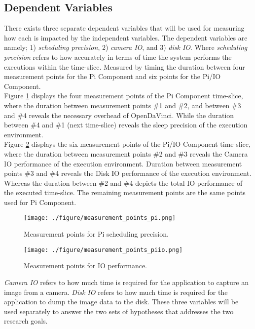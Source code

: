 \subsection{Dependent Variables} \label{section:dependent}
There exists three separate dependent variables that will be used for measuring how each is impacted by the independent variables. The dependent variables are namely; 1) \textit{scheduling precision}, 2) \textit{camera IO}, and 3) \textit{disk IO}. Where \textit{scheduling precision} refers to how accurately in terms of time the system performs the executions within the time-slice. Measured by timing the duration between four measurement points for the Pi Component and six points for the Pi/IO Component.\\ 

Figure \ref{pi_measure} displays the four measurement points of the Pi Component time-slice, where the duration between measurement points \#1 and \#2, and between \#3 and \#4 reveals the necessary overhead of OpenDaVinci. While the duration between \#4 and \#1 (next time-slice) reveals the sleep precision of the execution environment.\\

Figure \ref{piio_measure} displays the six measurement points of the Pi/IO Component time-slice, where the duration between measurement points \#2 and \#3 reveals the Camera IO performance of the execution environment. Duration between measurement points \#3 and \#4 reveals the Disk IO performance of the execution environment. Whereas the duration between \#2 and \#4 depicts the total IO performance of the executed time-slice. The remaining measurement points are the same points used for Pi Component.\\


\begin{figure}[ht]
\centering
     \texttt{[image: ./figure/measurement\_points\_pi.png]}
      \caption{Measurement points for Pi scheduling precision.}
       \label{pi_measure}
\end{figure}

\begin{figure}[ht]
\centering
     \texttt{[image: ./figure/measurement\_points\_piio.png]}
      \caption{Measurement points for IO performance.}
       \label{piio_measure}
\end{figure}

 \textit{Camera IO} refers to how much time is required for the application to capture an image from a camera. \textit{Disk IO} refers to how much time is required for the application to dump the image data to the disk. These three variables will be used separately to answer the two sets of hypotheses that addresses the two research goals. 

